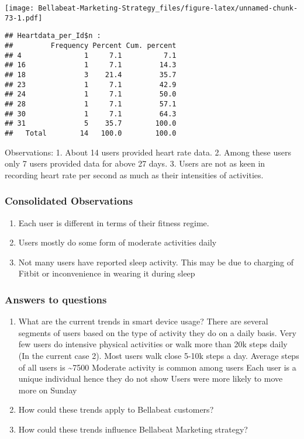 \documentclass[
]{article}
\providecommand{\tightlist}{%
  \setlength{\itemsep}{0pt}\setlength{\parskip}{0pt}}
\begin{document}
\texttt{[image: Bellabeat-Marketing-Strategy\_files/figure-latex/unnamed-chunk-73-1.pdf]}

\begin{verbatim}
## Heartdata_per_Id$n : 
##         Frequency Percent Cum. percent
## 4               1     7.1          7.1
## 16              1     7.1         14.3
## 18              3    21.4         35.7
## 23              1     7.1         42.9
## 24              1     7.1         50.0
## 28              1     7.1         57.1
## 30              1     7.1         64.3
## 31              5    35.7        100.0
##   Total        14   100.0        100.0
\end{verbatim}

Observations: 1. About 14 users provided heart rate data. 2. Among these
users only 7 users provided data for above 27 days. 3. Users are not as
keen in recording heart rate per second as much as their intensities of
activities.

\hypertarget{consolidated-observations}{%
\subsubsection{Consolidated
Observations}\label{consolidated-observations}}

\begin{enumerate}
\def\labelenumi{\arabic{enumi}.}
\tightlist
\item
  Each user is different in terms of their fitness regime.
\item
  Users mostly do some form of moderate activities daily
\item
  Not many users have reported sleep activity. This may be due to
  charging of Fitbit or inconvenience in wearing it during sleep
\end{enumerate}

\hypertarget{answers-to-questions}{%
\subsubsection{Answers to questions}\label{answers-to-questions}}

\begin{enumerate}
\def\labelenumi{\arabic{enumi}.}
\item
  What are the current trends in smart device usage? There are several
  segments of users based on the type of activity they do on a daily
  basis. Very few users do intensive physical activities or walk more
  than 20k steps daily (In the current case 2). Most users walk close
  5-10k steps a day. Average steps of all users is \textasciitilde7500
  Moderate activity is common among users Each user is a unique
  individual hence they do not show Users were more likely to move more
  on Sunday
\item
  How could these trends apply to Bellabeat customers?
\item
  How could these trends influence Bellabeat Marketing strategy?
\end{enumerate}
\end{document}
